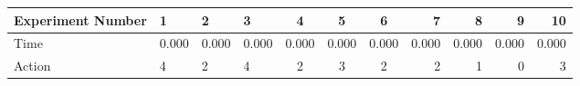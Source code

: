 \documentclass[8pt]{article}
\begin{document}
\begin{landscape}
\begin{tabular}{ | l | l | l | l | c | c | c | r | r | r | r | }
 \hline 
Experiment Number & 1 & 2 & 3 & 4 & 5 & 6 & 7 & 8 & 9 & 10\\ \hline
Time & 0.000 & 0.000 & 0.000 & 0.000 & 0.000 & 0.000 & 0.000 & 0.000 & 0.000 & 0.000\\ \hline
Action & 4 & 2 & 4 & 2 & 3 & 2 & 2 & 1 & 0 & 3\\ \hline\end{tabular}
\end{landscape}
\end{document}
